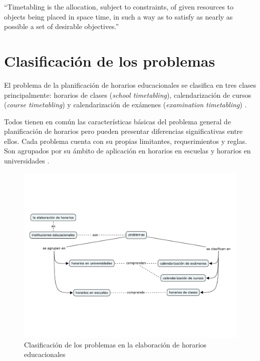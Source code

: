 \documentclass[draft,12pt,headsepline,footsepline,paper=letter]{scrreprt}
\begin{document}
“Timetabling is the allocation, subject to constraints, of given resources to objects being placed in space time, in such a way as to satisfy as nearly as possible a set of desirable objectives.”
\fi
\section{Clasificación de los problemas}

El problema de la planificación de horarios educacionales se clasifica en tres clases principalmente:
horarios de clases (\textit{school timetabling}),
calendarización de cursos (\textit{course timetabling}) y
calendarización de exámenes (\textit{examination timetabling}) \citep[p.~88]{schaerf99a-survey-of-automated}.

Todos tienen en común las características básicas del problema general de planificación de horarios pero pueden presentar diferencias significativas entre ellos. Cada problema cuenta con su propias limitantes, requerimientos y reglas. Son agrupados por su ámbito de aplicación en horarios en escuelas y horarios en universidades \citep[p.~10]{abdullah06heuristic-approaches}.

\begin{figure}[hbtp]
\centering
\includegraphics[width=.8\textwidth, trim=0 140 0 140]{timetabling_classification.pdf}
\caption[Clasificación del problema]{Clasificación de los problemas en la elaboración de horarios educacionales}
\label{fig:timetabling_classification}
\end{figure}
\end{document}
